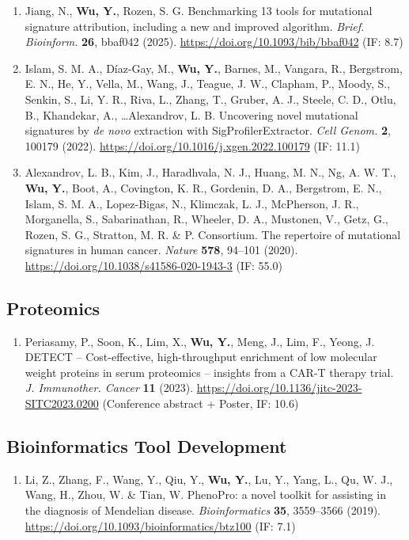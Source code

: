 \documentclass[11pt,a4paper]{article}
\newcommand{\urltext}[1]{\href{#1}{#1}}
\begin{document}
\begin{enumerate}[leftmargin=*,nosep,resume]
\item Jiang, N., \textbf{Wu, Y.}, Rozen, S. G. Benchmarking 13 tools for mutational signature attribution, including a new and improved algorithm. \textit{Brief. Bioinform.} \textbf{26}, bbaf042 (2025). \urltext{https://doi.org/10.1093/bib/bbaf042} (IF: 8.7)

\item Islam, S. M. A., Díaz-Gay, M., \textbf{Wu, Y.}, Barnes, M., Vangara, R., Bergstrom, E. N., He, Y., Vella, M., Wang, J., Teague, J. W., Clapham, P., Moody, S., Senkin, S., Li, Y. R., Riva, L., Zhang, T., Gruber, A. J., Steele, C. D., Otlu, B., Khandekar, A., \ldots Alexandrov, L. B. Uncovering novel mutational signatures by \textit{de novo} extraction with SigProfilerExtractor. \textit{Cell Genom.} \textbf{2}, 100179 (2022). \urltext{https://doi.org/10.1016/j.xgen.2022.100179} (IF: 11.1)

\item Alexandrov, L. B., Kim, J., Haradhvala, N. J., Huang, M. N., Ng, A. W. T., \textbf{Wu, Y.}, Boot, A., Covington, K. R., Gordenin, D. A., Bergstrom, E. N., Islam, S. M. A., Lopez-Bigas, N., Klimczak, L. J., McPherson, J. R., Morganella, S., Sabarinathan, R., Wheeler, D. A., Mustonen, V., Getz, G., Rozen, S. G., Stratton, M. R. \& P. Consortium. The repertoire of mutational signatures in human cancer. \textit{Nature} \textbf{578}, 94--101 (2020). \urltext{https://doi.org/10.1038/s41586-020-1943-3} (IF: 55.0)
\end{enumerate}

\subsection*{Proteomics}

\begin{enumerate}[leftmargin=*,nosep,resume]
\item Periasamy, P., Soon, K., Lim, X., \textbf{Wu, Y.}, Meng, J., Lim, F., Yeong, J. DETECT -- Cost-effective, high-throughput enrichment of low molecular weight proteins in serum proteomics -- insights from a CAR-T therapy trial. \textit{J. Immunother. Cancer} \textbf{11} (2023). \urltext{https://doi.org/10.1136/jitc-2023-SITC2023.0200} (Conference abstract + Poster, IF: 10.6)
\end{enumerate}

\subsection*{Bioinformatics Tool Development}

\begin{enumerate}[leftmargin=*,nosep,resume]
\item Li, Z., Zhang, F., Wang, Y., Qiu, Y., \textbf{Wu, Y.}, Lu, Y., Yang, L., Qu, W. J., Wang, H., Zhou, W. \& Tian, W. PhenoPro: a novel toolkit for assisting in the diagnosis of Mendelian disease. \textit{Bioinformatics} \textbf{35}, 3559--3566 (2019). \urltext{https://doi.org/10.1093/bioinformatics/btz100} (IF: 7.1)
\end{enumerate}
\end{document}
